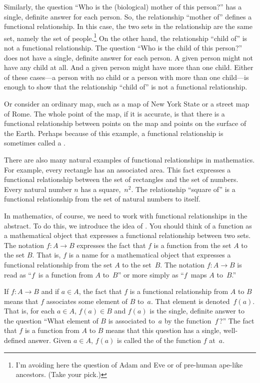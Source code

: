 Similarly, the question ``Who is the (biological) mother of this person?'' has
a single, definite answer for each person.  So, the
relationship ``mother of'' defines a functional relationship.
In this case, the two sets in the relationship are the same set,
namely the set of people.\footnote{I'm avoiding here the question
of Adam and Eve or of pre-human ape-like ancestors.  (Take your 
pick.)}  On the other hand, the relationship ``child of''
is not a functional relationship.  The question ``Who is the
child of this person?'' does not have a single, definite answer for
each person.  A given person might not have any child at all.
And a given person might have more than one child.  Either of
these cases---a person with no child or a person with more than
one child---is enough to show that the relationship
``child of'' is not a functional relationship.

Or consider an ordinary map, such as a map of New York State or
a street map of Rome.  The whole point of the map, if it is
accurate, is that there is a functional relationship between
points on the map and points on the surface of the Earth.
Perhaps because of this example, a functional relationship
is sometimes called a .

There are also many natural examples of functional relationships
in mathematics.  For example, every rectangle has an associated
area.  This fact expresses a functional relationship between the
set of rectangles and the set of numbers.  Every natural number $n$
has a square,~$n^2$.  The relationship ``square of'' is a functional
relationship from the set of natural numbers to itself.  

In mathematics, of course, we need to work with functional
relationships in the abstract.  To do this, we introduce
the idea of .  You should think of a function
as a mathematical object that expresses a functional relationship
between two sets.  The notation $f\colon A\to B$ expresses
the fact that $f$ is a function from the set $A$ to the
set $B$.  That is, $f$ is a name for a mathematical object
that expresses a functional relationship from the set $A$ to the set~$B$.
The notation $f\colon A\to B$ is
read as ``$f$~is a function from $A$ to~$B$'' or more simply
as ``$f$~maps $A$ to~$B$.''

If $f\colon A\to B$ and if $a\in A$, the fact that $f$ is
a functional relationship from $A$ to $B$ means that $f$ associates
some element of $B$ to~$a$.  That element is denoted~$f(a)$.
That is, for each $a\in A$, $f(a)\in B$ and $f(a)$ is the single,
definite answer to the question ``What element of $B$ is
associated to~$a$ by the function~$f\,$?''  The fact that
$f$ is a function from $A$ to $B$ means that this question
has a single, well-defined answer.  Given $a\in A$,
$f(a)$ is called the 
of the function $f$ at~$a$.

